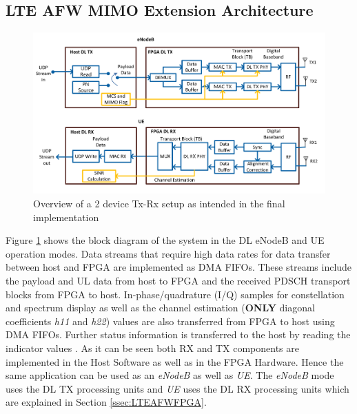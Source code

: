 \subsection{LTE AFW MIMO Extension Architecture}\label{ssec:LTEAFWArch}

\begin{figure}[!htb]
    \centering
    \includegraphics[width=\linewidth]{images/LTEAFW2x2ExtBlockDiagram.png}
    \caption{Overview of a 2 device Tx-Rx setup as intended in the final implementation}
    \label{fig:LTEAFW2DeviceOverview}
\end{figure}

Figure %
\ref{fig:LTEAFW2DeviceOverview} shows the block diagram of the system in the DL eNodeB and UE operation modes. Data streams that require high data rates for data transfer between host and FPGA are implemented as DMA FIFOs. These streams include the payload and UL data from host to FPGA and the received PDSCH transport blocks from FPGA to host. In-phase/quadrature (I/Q) samples for constellation and spectrum display as well as the channel estimation (\textbf{ONLY} diagonal coefficients \textit{h11} and \textit{h22}) values are also transferred from FPGA to host using DMA FIFOs. Further status information is transferred to the host by reading the indicator values \cite{LTEAFWManual}. As it can be seen both RX and TX components are implemented in the Host Software as well as in the FPGA Hardware. Hence the same application can be used as an \textit{eNodeB} as well as \textit{UE}. The \textit{eNodeB} mode uses the DL TX processing units and \textit{UE} uses the DL RX processing units which are explained in Section \ref{ssec:LTEAFWFPGA}.


